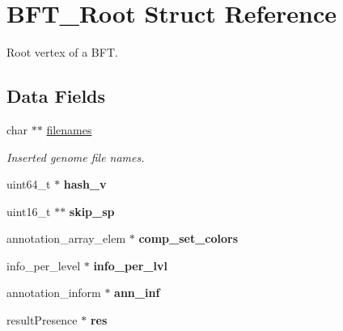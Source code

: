 \hypertarget{structBFT__Root}{}\section{B\+F\+T\+\_\+\+Root Struct Reference}
\label{structBFT__Root}


Root vertex of a B\+F\+T.  


\subsection*{Data Fields}
\begin{DoxyCompactItemize}
\item 
char $\ast$$\ast$ \hyperlink{structBFT__Root_a8022a504e2c0dd2d800efda892413ce7}{filenames}
\begin{DoxyCompactList}\small\item\em Inserted genome file names. \end{DoxyCompactList}\item 
\hypertarget{structBFT__Root_a789074cc3578299eaaba89b29dd5fadb}{}uint64\+\_\+t $\ast$ {\bfseries hash\+\_\+v}\label{structBFT__Root_a789074cc3578299eaaba89b29dd5fadb}

\item 
\hypertarget{structBFT__Root_a7cb8a4466eecbbf38c65c5dc47ee0d2d}{}uint16\+\_\+t $\ast$$\ast$ {\bfseries skip\+\_\+sp}\label{structBFT__Root_a7cb8a4466eecbbf38c65c5dc47ee0d2d}

\item 
\hypertarget{structBFT__Root_ac4116550c32152d92c31fb7fad439967}{}annotation\+\_\+array\+\_\+elem $\ast$ {\bfseries comp\+\_\+set\+\_\+colors}\label{structBFT__Root_ac4116550c32152d92c31fb7fad439967}

\item 
\hypertarget{structBFT__Root_a30af03cee8ba9b5657d8b4f329d21e71}{}info\+\_\+per\+\_\+level $\ast$ {\bfseries info\+\_\+per\+\_\+lvl}\label{structBFT__Root_a30af03cee8ba9b5657d8b4f329d21e71}

\item 
\hypertarget{structBFT__Root_afcaa7dcf9bdb8550b76c6b0327b86065}{}annotation\+\_\+inform $\ast$ {\bfseries ann\+\_\+inf}\label{structBFT__Root_afcaa7dcf9bdb8550b76c6b0327b86065}

\item 
\hypertarget{structBFT__Root_ae520818d6f6ff0178671c24db1f5c1c3}{}result\+Presence $\ast$ {\bfseries res}\label{structBFT__Root_ae520818d6f6ff0178671c24db1f5c1c3}


\end{DoxyCompactItemize}
